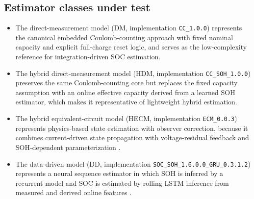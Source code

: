 \documentclass[review,nopreprintline]{elsarticle}
\begin{document}
\subsection{Estimator classes under test}
\begin{itemize}[leftmargin=*]
    \item The direct-measurement model (DM, implementation \texttt{CC\_1.0.0}) represents the canonical embedded Coulomb-counting approach with fixed nominal capacity and explicit full-charge reset logic, and serves as the low-complexity reference for integration-driven SOC estimation.
    \item The hybrid direct-measurement model (HDM, implementation \texttt{CC\_SOH\_1.0.0}) preserves the same Coulomb-counting core but replaces the fixed capacity assumption with an online effective capacity derived from a learned SOH estimator, which makes it representative of lightweight hybrid estimation.
    \item The hybrid equivalent-circuit model (HECM, implementation \texttt{ECM\_0.0.3}) represents physics-based state estimation with observer correction, because it combines current-driven state propagation with voltage-residual feedback and SOH-dependent parameterization \cite{gaoEnhancedStateofchargeEstimation2022,guoSystematicReviewElectrochemical2024}.
    \item The data-driven model (DD, implementation \texttt{SOC\_SOH\_1.6.0.0\_GRU\_0.3.1.2}) represents a neural sequence estimator in which SOH is inferred by a recurrent model and SOC is estimated by rolling LSTM inference from measured and derived online features \cite{mondalEstimatingStateofChargeLithiumIon2024,yaoSmarterBatteryManagement2025b}.
\end{itemize}
\end{document}
